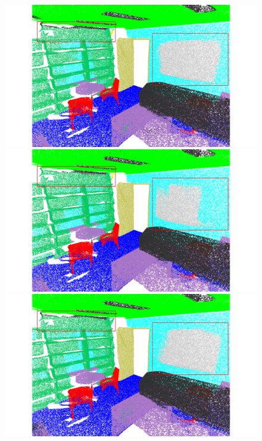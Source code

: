 \begin{figure}[htbp]
    \begin{minipage}{0.02\textwidth}
        \centering
    \end{minipage}
    \hfill
    \begin{minipage}{0.185\textwidth}
        \centering
        \includegraphics[width=\textwidth]{fig/supplement/semantic_segmentation/office_35/DAPT_office_35.pdf}
    \end{minipage}
    \hfill
    \begin{minipage}{0.185\textwidth}
        \centering
        \includegraphics[width=\textwidth]{fig/supplement/semantic_segmentation/office_35/IDPT_office_35.pdf} %
    \end{minipage}
    \hfill
    \begin{minipage}{0.185\textwidth}
        \centering
        \includegraphics[width=\textwidth]{fig/supplement/semantic_segmentation/office_35/PointGST_office_35.pdf}

\end{minipage}
\end{figure}
